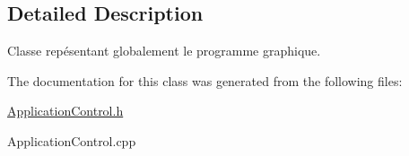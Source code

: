 \subsection{Detailed Description}
Classe repésentant globalement le programme graphique. 

The documentation for this class was generated from the following files\-:\begin{DoxyCompactItemize}
\item 
\hyperlink{ApplicationControl_8h}{Application\-Control.\-h}\item 
Application\-Control.\-cpp\end{DoxyCompactItemize}
